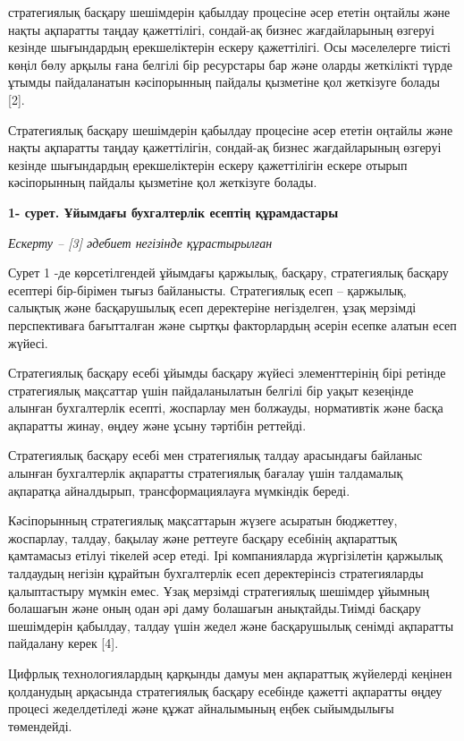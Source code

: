 стратегиялық басқару шешімдерін қабылдау процесіне әсер ететін оңтайлы
және нақты ақпаратты таңдау қажеттілігі, сондай-ақ бизнес жағдайларының
өзгеруі кезінде шығындардың ерекшеліктерін ескеру қажеттілігі. Осы
мәселелерге тиісті көңіл бөлу арқылы ғана белгілі бір ресурстары бар
және оларды жеткілікті түрде ұтымды пайдаланатын кәсіпорынның пайдалы
қызметіне қол жеткізуге болады {[}2{]}.

Стратегиялық басқару шешімдерін қабылдау процесіне әсер ететін оңтайлы
және нақты ақпаратты таңдау қажеттілігін, сондай-ақ бизнес жағдайларының
өзгеруі кезінде шығындардың ерекшеліктерін ескеру қажеттілігін ескере
отырып кәсіпорынның пайдалы қызметіне қол жеткізуге болады.

{\bfseries 1- сурет. Ұйымдағы бухгалтерлік есептің құрамдастары}

\emph{Ескерту -- {[}3{]} әдебиет негізінде құрастырылған}

Сурет 1 -де көрсетілгендей ұйымдағы қаржылық, басқару, стратегиялық
басқару есептері бір-бірімен тығыз байланысты. Стратегиялық есеп --
қаржылық, салықтық және басқарушылық есеп деректеріне негізделген, ұзақ
мерзімді перспективаға бағытталған және сыртқы факторлардың әсерін
есепке алатын есеп жүйесі.

Стратегиялық басқару есебі ұйымды басқару жүйесі элементтерінің бірі
ретінде стратегиялық мақсаттар үшін пайдаланылатын белгілі бір уақыт
кезеңінде алынған бухгалтерлік есепті, жоспарлау мен болжауды,
нормативтік және басқа ақпаратты жинау, өңдеу және ұсыну тәртібін
реттейді.

Стратегиялық басқару есебі мен стратегиялық талдау арасындағы байланыс
алынған бухгалтерлік ақпаратты стратегиялық бағалау үшін талдамалық
ақпаратқа айналдырып, трансформациялауға мүмкіндік береді.

Кәсіпорынның стратегиялық мақсаттарын жүзеге асыратын бюджеттеу,
жоспарлау, талдау, бақылау және реттеуге басқару есебінің ақпараттық
қамтамасыз етілуі тікелей әсер етеді. Ірі компанияларда жүргізілетін
қаржылық талдаудың негізін құрайтын бухгалтерлік есеп деректерінсіз
стратегияларды қалыптастыру мүмкін емес. Ұзақ мерзімді стратегиялық
шешімдер ұйымның болашағын және оның одан әрі даму болашағын
анықтайды.Тиімді басқару шешімдерін қабылдау, талдау үшін жедел және
басқарушылық сенімді ақпаратты пайдалану керек {[}4{]}.

Цифрлық технологиялардың қарқынды дамуы мен ақпараттық жүйелерді кеңінен
қолданудың арқасында стратегиялық басқару есебінде қажетті ақпаратты
өңдеу процесі жеделдетіледі және құжат айналымының еңбек сыйымдылығы
төмендейді.

